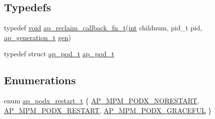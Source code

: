 \subsection*{Typedefs}
\begin{DoxyCompactItemize}
\item 
typedef \hyperlink{group__MOD__ISAPI_gacd6cdbf73df3d9eed42fa493d9b621a6}{void} \hyperlink{group__APACHE__MPM_ga94be3eb6c17612b53962372f8b954837}{ap\+\_\+reclaim\+\_\+callback\+\_\+fn\+\_\+t}(\hyperlink{pcre_8txt_a42dfa4ff673c82d8efe7144098fbc198}{int} childnum, pid\+\_\+t pid, \hyperlink{scoreboard_8h_a36af569e52dd926cc530df071af3d939}{ap\+\_\+generation\+\_\+t} \hyperlink{group__APACHE__MPM_ga37021508479f4dcebba4054a070491d8}{gen})
\item 
typedef struct \hyperlink{structap__pod__t}{ap\+\_\+pod\+\_\+t} \hyperlink{group__APACHE__MPM_ga12f0c95a29b7205d0ebdaabc67bd22fe}{ap\+\_\+pod\+\_\+t}
\end{DoxyCompactItemize}
\subsection*{Enumerations}
\begin{DoxyCompactItemize}
\item 
enum \hyperlink{group__APACHE__MPM_gacd6b02ad1bfe3abd64999dc5e38e6633}{ap\+\_\+podx\+\_\+restart\+\_\+t} \{ \hyperlink{group__APACHE__MPM_ggacd6b02ad1bfe3abd64999dc5e38e6633a3c1ec81e05ee77674173182a979fa651}{A\+P\+\_\+\+M\+P\+M\+\_\+\+P\+O\+D\+X\+\_\+\+N\+O\+R\+E\+S\+T\+A\+RT}, 
\hyperlink{group__APACHE__MPM_ggacd6b02ad1bfe3abd64999dc5e38e6633a7c7d4b825bc5c058af3365a19763833b}{A\+P\+\_\+\+M\+P\+M\+\_\+\+P\+O\+D\+X\+\_\+\+R\+E\+S\+T\+A\+RT}, 
\hyperlink{group__APACHE__MPM_ggacd6b02ad1bfe3abd64999dc5e38e6633a8206006cad037a4b23fe2be3192824e8}{A\+P\+\_\+\+M\+P\+M\+\_\+\+P\+O\+D\+X\+\_\+\+G\+R\+A\+C\+E\+F\+UL}
 \}
\end{DoxyCompactItemize}
